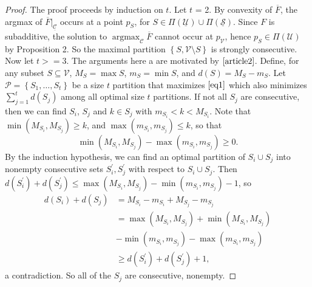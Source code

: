 \documentclass{article}
\theoremstyle{case}
\DeclareMathOperator*{\argmax}{argmax} %
\begin{document}
\begin{proof}
The proof proceeds by induction on $t$. Let $t$ = 2. By convexity of $\overline{F}$, the argmax of $\overline{F} |_{\underline{\mathcal{C}}}$ occurs at a point $p_S$, for $S \in \Pi\left( \underline{\mathcal{U}}\right) \cup \Pi\left( \underline{\mathcal{S}}\right)$. Since $F$ is subadditive, the solution to $\argmax_{\mathcal{C}}{\overline{F}}$ cannot occur at $p_{\mathcal{V}}$, hence $p_S \in \Pi\left( \mathcal{U}\right)$ by Proposition 2. So the maximal partition $\left\lbrace S, \mathcal{V} \setminus S\right\rbrace$ is strongly consecutive. Now let $t >= 3$. The arguments here a are motivated by $\cite{article2}$. Define, for any subset $S \subseteq \mathcal{V}$, $M_S = \max S$, $m_S = \min S$, and $d\left(S\right) = M_S - m_S$. Let $\mathcal{P} = \left\lbrace S_1, \dots, S_t\right\rbrace$ be a size $t$ partition that maximizes $\ref{eq1}$ which also minimizes $\sum_{j=1}^t d\left(S_j\right)$ among all optimal size $t$ partitions. If not all $S_j$ are consecutive, then we can find $S_i$, $S_j$ and $k \in S_j$ with $m_{S_i} < k < M_{S_i}$. Note that $\min\left( M_{S_i}, M_{S_j}\right) \geq k$,  and $\max\left( m_{S_i}, m_{S_j} \right) \leq k$, so that 
\[
\min\left( M_{S_i}, M_{S_j}\right) - \max\left( m_{S_i}, m_{S_j} \right) \geq 0.
\] 
By the induction hypothesis, we can find an optimal partition of $S_i \cup S_j$ into nonempty consecutive sets $S^{\prime}_i, S^{\prime}_j$ with respect to $S_i \cup S_j$. Then $d\left( S^{\prime}_i\right) + d\left( S^{\prime}_j\right) \leq \max\left( M_{S_i}, M_{S_j}\right) - \min\left( m_{S_i}, m_{S_j}\right) - 1$, so
\begin{align*}
d\left(S_i\right) + d\left( S_j\right) &= M_{S_i} - m_{S_i} + M_{S_j} - m_{S_j} \\
&= \max\left(M_{S_i}, M_{S_j}\right) + \min\left(M_{S_i}, M_{S_j}\right) \\
&- \min\left( m_{S_i}, m_{S_j} \right) - \max\left( m_{S_i}, m_{S_j} \right) \\
&\geq d\left(S^{\prime}_i\right) + d\left(S^{\prime}_j\right) + 1,
\end{align*}
a contradiction. So all of the $S_j$ are consecutive, nonempty.
\end{proof}
\end{document}
